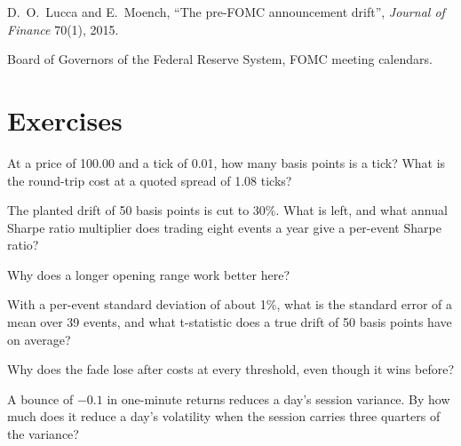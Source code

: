 \begin{omsources}
\item D.~O.~Lucca and E.~Moench, ``The pre-FOMC announcement drift'', \emph{Journal of Finance} 70(1), 2015.
\item Board of Governors of the Federal Reserve System, FOMC meeting calendars.
\end{omsources}

\section{Exercises}

\begin{exercise}[$\star$]\label{exo:s1:short-term-futures-strategies:1}
At a price of 100.00 and a tick of 0.01, how many basis points is a tick? What is the round-trip cost at a quoted spread of 1.08 ticks?
\end{exercise}

\begin{exercise}[$\star$]\label{exo:s1:short-term-futures-strategies:2}
The planted drift of 50 basis points is cut to 30\%. What is left, and what annual Sharpe ratio multiplier does trading eight events a year give a
per-event Sharpe ratio?
\end{exercise}

\begin{exercise}[$\star$]\label{exo:s1:short-term-futures-strategies:3}
Why does a longer opening range work better here?
\end{exercise}

\begin{exercise}[$\star\star$]\label{exo:s1:short-term-futures-strategies:4}
With a per-event standard deviation of about 1\%, what is the standard error of a mean over 39 events, and what t-statistic does a true drift of 50
basis points have on average?
\end{exercise}

\begin{exercise}[$\star\star$]\label{exo:s1:short-term-futures-strategies:5}
Why does the fade lose after costs at every threshold, even though it wins before?
\end{exercise}

\begin{exercise}[$\star\star$]\label{exo:s1:short-term-futures-strategies:6}
A bounce of $-0.1$ in one-minute returns reduces a day's session variance. By how much does it reduce a day's volatility when the session carries three
quarters of the variance?
\end{exercise}

